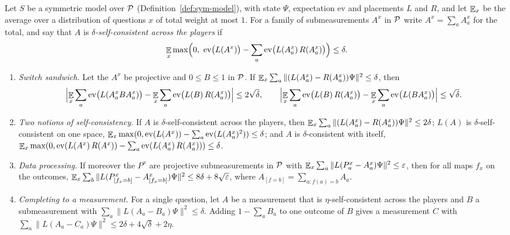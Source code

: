 \begin{lemma}
\label{lem:co-switch-sandwich-self-consistency}
\leanok
Let $S$ be a symmetric model over $\cal{P}$ (Definition~\ref{def:sym-model}), with state $\Psi$,
expectation $\mathrm{ev}$ and placements $L$ and $R$, and let $\E_x$ be the average over a
distribution of questions $x$ of total weight at most $1$. For a family of submeasurements $A^x$ in
$\cal{P}$ write $A^x = \sum_a A^x_a$ for the total, and say that $A$ is \emph{$\delta$-self-consistent
across the players} if
\[
  \E_x \max\Bigl(0,\ \mathrm{ev}\bigl(L(A^x)\bigr) - \sum_a \mathrm{ev}\bigl(L(A^x_a)\, R(A^x_a)\bigr)\Bigr)
  \leq \delta.
\]
\begin{enumerate}
  \item \emph{Switch sandwich.} Let the $A^x$ be projective and $0 \leq B \leq 1$ in $\cal{P}$. If
    $\E_x \sum_a \| (L(A^x_a) - R(A^x_a)) \Psi \|^2 \leq \delta$, then
    \[
      \Bigl| \E_x \sum_a \mathrm{ev}\bigl(L(A^x_a B A^x_a)\bigr) - \E_x \sum_a
      \mathrm{ev}\bigl(L(B)\, R(A^x_a)\bigr) \Bigr| \leq 2 \sqrt{\delta}, \qquad
      \Bigl| \E_x \sum_a \mathrm{ev}\bigl(L(B)\, R(A^x_a)\bigr) - \E_x \sum_a
      \mathrm{ev}\bigl(L(B A^x_a)\bigr) \Bigr| \leq \sqrt{\delta}.
    \]
  \item \emph{Two notions of self-consistency.} If $A$ is $\delta$-self-consistent across the
    players, then $\E_x \sum_a \| (L(A^x_a) - R(A^x_a)) \Psi \|^2 \leq 2 \delta$; $L(A)$ is
    $\delta$-self-consistent on one space, $\E_x \max(0, \mathrm{ev}(L(A^x)) - \sum_a
    \mathrm{ev}(L(A^x_a)^2)) \leq \delta$; and $A$ is $\delta$-consistent with itself,
    $\E_x \max(0, \mathrm{ev}(L(A^x)\, R(A^x)) - \sum_a \mathrm{ev}(L(A^x_a)\, R(A^x_a))) \leq
    \delta$.
  \item \emph{Data processing.} If moreover the $P^x$ are projective submeasurements in $\cal{P}$
    with $\E_x \sum_a \| L(P^x_a - A^x_a) \Psi \|^2 \leq \eps$, then for all maps $f_x$ on the
    outcomes, $\E_x \sum_b \| L(P^x_{[f_x = b]} - A^x_{[f_x = b]}) \Psi \|^2 \leq 8 \delta + 8
    \sqrt{\eps}$, where $A_{[f = b]} = \sum_{a : f(a) = b} A_a$.
  \item \emph{Completing to a measurement.} For a single question, let $A$ be a measurement that
    is $\eta$-self-consistent across the players and $B$ a submeasurement with $\sum_a \| L(A_a -
    B_a) \Psi \|^2 \leq \delta$. Adding $1 - \sum_a B_a$ to one outcome of $B$ gives a measurement
    $C$ with $\sum_a \| L(A_a - C_a) \Psi \|^2 \leq 2 \delta + 4 \sqrt{\delta} + 2 \eta$.
\end{enumerate}
\end{lemma}

